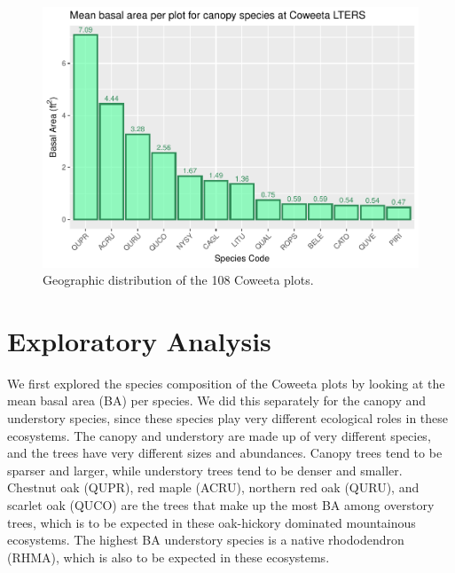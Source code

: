 \documentclass[
  12pt,
]{article}
\begin{document}
\begin{figure}
\centering
\includegraphics{ProjectDraft_files/figure-latex/unnamed-chunk-2-1.pdf}
\caption{Geographic distribution of the 108 Coweeta plots.}
\end{figure}

\newpage

\hypertarget{exploratory-analysis}{%
\section{Exploratory Analysis}\label{exploratory-analysis}}

We first explored the species composition of the Coweeta plots by
looking at the mean basal area (BA) per species. We did this separately
for the canopy and understory species, since these species play very
different ecological roles in these ecosystems. The canopy and
understory are made up of very different species, and the trees have
very different sizes and abundances. Canopy trees tend to be sparser and
larger, while understory trees tend to be denser and smaller. Chestnut
oak (QUPR), red maple (ACRU), northern red oak (QURU), and scarlet oak
(QUCO) are the trees that make up the most BA among overstory trees,
which is to be expected in these oak-hickory dominated mountainous
ecosystems. The highest BA understory species is a native rhododendron
(RHMA), which is also to be expected in these ecosystems.
\end{document}
